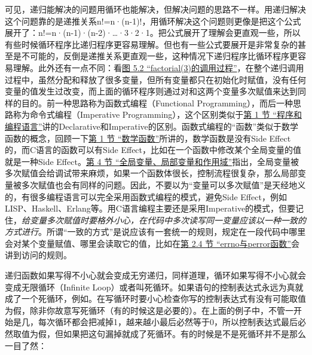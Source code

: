可见，递归能解决的问题用循环也能解决，但解决问题的思路不一样。用递归解决这个问题靠的是递推关系n!=n·(n-1)!，用循环解决这个问题则更像是把这个公式展开了：n!=n·(n-1)·(n-2)·…·3·2·1。把公式展开了理解会更直观一些，所以有些时候循环程序比递归程序更容易理解。但也有一些公式要展开是非常复杂的甚至是不可能的，反倒是递推关系更直观一些，这种情况下递归程序比循环程序更容易理解。此外还有一点不同：看\hyperlink{db.ch05s03.id2723116}{图 5.\BookSplit{}2 “factorial(3)的调用过程”}，在整个递归调用过程中，虽然分配和释放了很多变量，但所有变量都只在初始化时赋值，没有任何变量的值发生过改变，而上面的循环程序则通过对和这两个变量多次赋值来达到同样的目的。前一种思路称为函数式编程（Functional Programming），而后一种思路称为命令式编程（Imperative Programming），这个区别类似于\hyperlink{db.intro.program}{第 1 节 “程序和编程语言”}讲的Declarative和Imperative的区别。函数式编程的“函数”类似于数学函数的概念，回顾一下\hyperlink{db.ch03s01.id2712397}{第 1 节 “数学函数”}所讲的，数学函数是没有Side Effect的，而C语言的函数可以有Side Effect，比如在一个函数中修改某个全局变量的值就是一种Side Effect。\hyperlink{db.ch03s04.id2714471}{第 4 节 “全局变量、局部变量和作用域”}指出，全局变量被多次赋值会给调试带来麻烦，如果一个函数体很长，控制流程很复杂，那么局部变量被多次赋值也会有同样的问题。因此，不要以为“变量可以多次赋值”是天经地义的，有很多编程语言可以完全采用函数式编程的模式，避免Side Effect，例如LISP、Haskell、Erlang等。用C语言编程主要还是采用Imperative的模式，但要记住，\emph{给变量多次赋值时要格外小心，在代码中多次读写同一变量应该以一种一致的方式进行}。所谓“一致的方式”是说应该有一套统一的规则，规定在一段代码中哪里会对某个变量赋值、哪里会读取它的值，比如在\hyperlink{db.ch25s02.id2830807}{第 2.\BookSplit{}4 节 “errno与perror函数”}会讲到访问的规则。



递归函数如果写得不小心就会变成无穷递归，同样道理，循环如果写得不小心就会变成无限循环（Infinite Loop）或者叫死循环。如果语句的控制表达式永远为真就成了一个死循环，例如。在写循环时要小心检查你写的控制表达式有没有可能取值为假，除非你故意写死循环（有的时候这是必要的）。在上面的例子中，不管一开始是几，每次循环都会把减掉1，越来越小最后必然等于0，所以控制表达式最后必然取值为假，但如果把这句漏掉就成了死循环。有的时候是不是死循环并不是那么一目了然：


